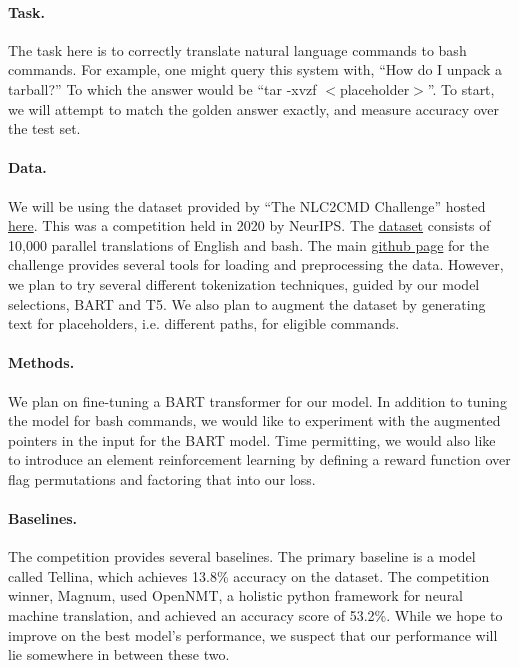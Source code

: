 \documentclass[12pt]{article}
\begin{document}
\paragraph{Task.}
The task here is to correctly translate natural language commands to bash
commands. For example, one might query this system with, ``How do I unpack a
tarball?'' To which the answer would be ``tar -xvzf $<$placeholder$>$''. To
start, we will attempt to match the golden answer exactly, and measure accuracy
over the test set.

\paragraph{Data.}
We will be using the dataset provided by ``The NLC2CMD Challenge'' hosted
\href{https://nlc2cmd.us-east.mybluemix.net/}{here}. This was a competition
held in 2020 by NeurIPS. The
\href{https://github.com/IBM/clai/blob/nlc2cmd/docs/nl2bash-data.md}{dataset}
consists of 10,000 parallel translations of English and bash. The main
\href{https://github.com/IBM/clai/tree/nlc2cmd}{github page} for the challenge
provides several tools for loading and preprocessing the data. However, we plan
to try several different tokenization techniques, guided by our model
selections, BART and T5. We also plan to augment the dataset by generating text
for placeholders, i.e. different paths, for eligible commands.

\paragraph{Methods.}
We plan on fine-tuning a BART transformer for our model. In addition to tuning
the model for bash commands, we would like to experiment with the augmented
pointers in the input for the BART model. Time permitting, we would also like
to introduce an element reinforcement learning by defining a reward function
over flag permutations and factoring that into our loss.

\paragraph{Baselines.}
The competition provides several baselines. The primary baseline is a model
called Tellina, which achieves 13.8\% accuracy on the dataset. The competition
winner, Magnum, used OpenNMT, a holistic python framework for neural machine
translation, and achieved an accuracy score of 53.2\%. While we hope to improve
on the best model's performance, we suspect that our performance will lie
somewhere in between these two.
\end{document}
